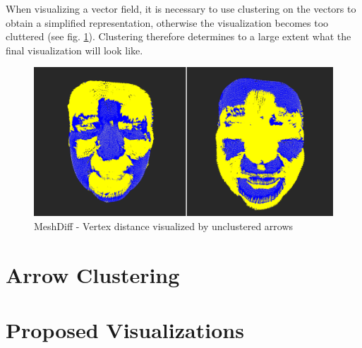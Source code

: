 When visualizing a vector field, it is necessary to use clustering on the vectors to obtain a simplified representation, otherwise the visualization becomes too cluttered (see fig. \ref{fig:meshdiff_unclustered}). Clustering therefore determines to a large extent what the final visualization will look like.

\begin{figure}[h]
\centering
\includegraphics[width=\textwidth]{./img/meshdiff-unclustered_arrows.PNG}
\caption{MeshDiff - Vertex distance visualized by unclustered arrows}
\label{fig:meshdiff_unclustered}
\end{figure}
\section{Arrow Clustering}


\section{Proposed Visualizations}